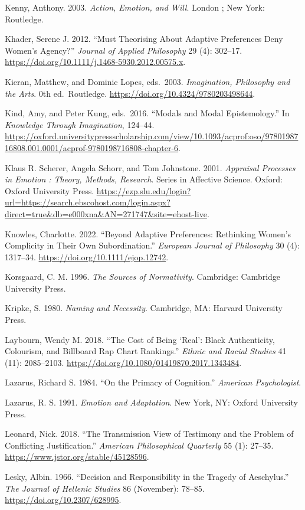 \documentclass[
  letterpaper,
  DIV=11,
  numbers=noendperiod]{scrartcl}
\theoremstyle{remark}
\begin{document}
Kenny, Anthony. 2003. \emph{Action, Emotion, and Will}. London ; New
York: Routledge.

Khader, Serene J. 2012. ``Must Theorising About Adaptive Preferences
Deny Women's Agency?'' \emph{Journal of Applied Philosophy} 29 (4):
302--17. \url{https://doi.org/10.1111/j.1468-5930.2012.00575.x}.

Kieran, Matthew, and Dominic Lopes, eds.~2003. \emph{Imagination,
Philosophy and the Arts}. 0th ed.~Routledge.
\url{https://doi.org/10.4324/9780203498644}.

Kind, Amy, and Peter Kung, eds.~2016. ``Modals and Modal Epistemology.''
In \emph{Knowledge Through Imagination}, 124--44.
\url{https://oxford.universitypressscholarship.com/view/10.1093/acprof:oso/9780198716808.001.0001/acprof-9780198716808-chapter-6}.

Klaus R. Scherer, Angela Schorr, and Tom Johnstone. 2001.
\emph{Appraisal Processes in Emotion : Theory, Methods, Research}.
Series in Affective Science. Oxford: Oxford University Press.
\url{https://ezp.slu.edu/login?url=https://search.ebscohost.com/login.aspx?direct=true&db=e000xna&AN=271747&site=ehost-live}.

Knowles, Charlotte. 2022. ``Beyond Adaptive Preferences: Rethinking
Women's Complicity in Their Own Subordination.'' \emph{European Journal
of Philosophy} 30 (4): 1317--34.
\url{https://doi.org/10.1111/ejop.12742}.

Korsgaard, C. M. 1996. \emph{The Sources of Normativity}. Cambridge:
Cambridge University Press.

Kripke, S. 1980. \emph{Naming and Necessity}. Cambridge, MA: Harvard
University Press.

Laybourn, Wendy M. 2018. ``The Cost of Being `Real': Black Authenticity,
Colourism, and Billboard Rap Chart Rankings.'' \emph{Ethnic and Racial
Studies} 41 (11): 2085--2103.
\url{https://doi.org/10.1080/01419870.2017.1343484}.

Lazarus, Richard S. 1984. ``On the Primacy of Cognition.''
\emph{American Psychologist}.

Lazarus, R. S. 1991. \emph{Emotion and Adaptation}. New York, NY: Oxford
University Press.

Leonard, Nick. 2018. ``The Transmission View of Testimony and the
Problem of Conflicting Justification.'' \emph{American Philosophical
Quarterly} 55 (1): 27--35. \url{https://www.jstor.org/stable/45128596}.

Lesky, Albin. 1966. ``Decision and Responsibility in the Tragedy of
Aeschylus.'' \emph{The Journal of Hellenic Studies} 86 (November):
78--85. \url{https://doi.org/10.2307/628995}.
\end{document}
